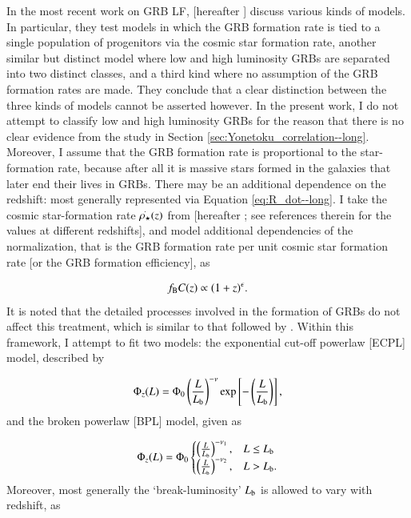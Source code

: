 In the most recent work on GRB LF, \cite{Amaral-Rogers_et_al.-2017-MNRAS} [hereafter ] discuss various kinds of models. In particular, they test models in which the GRB formation rate is tied to a single population of progenitors via the cosmic star formation rate, another similar but distinct model where low and high luminosity GRBs are separated into two distinct classes, and a third kind where no assumption of the GRB formation rates are made. They conclude that a clear distinction between the three kinds of models cannot be asserted however. In the present work, I do not attempt to classify low and high luminosity GRBs for the reason that there is no clear evidence from the study in Section \ref{sec:Yonetoku_correlation--long}. Moreover, I assume that the GRB formation rate is proportional to the star-formation rate, because after all it is massive stars formed in the galaxies that later end their lives in GRBs. There may be an additional dependence on the redshift: most generally represented via Equation \ref{eq:R_dot--long}. I take the cosmic star-formation rate $\overset{.}{\rho_{\star}} (z)$ from \cite{Bouwens_et_al.-2015-ApJ} [hereafter ; see references therein for the values at different redshifts], and model additional dependencies of the normalization, that is the GRB formation rate per unit cosmic star formation rate [or the GRB formation efficiency], as 

\begin{equation}
f_{\rm{B}} C(z) \propto (1+z)^{\epsilon}.
\label{eq:fB.C_of_z--long}
\end{equation} It is noted that the detailed processes involved in the formation of GRBs do not affect this treatment, which is similar to that followed by . Within this framework, I attempt to fit two models: the exponential cut-off powerlaw [ECPL] model, described by

\begin{equation}
\Phi_z(L) = \Phi_{0}
\left( \frac{L}{L_{\rm{b}}} \right)^{-\nu} \exp \left[ -\left( \frac{L}{L_{\rm{b}}} \right) \right],
\label{eq:The_ECPL_model--long}
\end{equation} and the broken powerlaw [BPL] model, given as

\begin{equation}
\Phi_z(L) = \Phi_{0} \begin{cases}
\left( \frac{L}{L_{\rm{b}}} \right)^{-\nu_1}, & L \leq L_{\rm{b}}\\
\left( \frac{L}{L_{\rm{b}}} \right)^{-\nu_2}, & L > L_{\rm{b}}.
\end{cases}
\label{eq:The_BPL_model--long}
\end{equation} Moreover, most generally the `break-luminosity' $L_{\rm{b}}$ is allowed to vary with redshift, as

